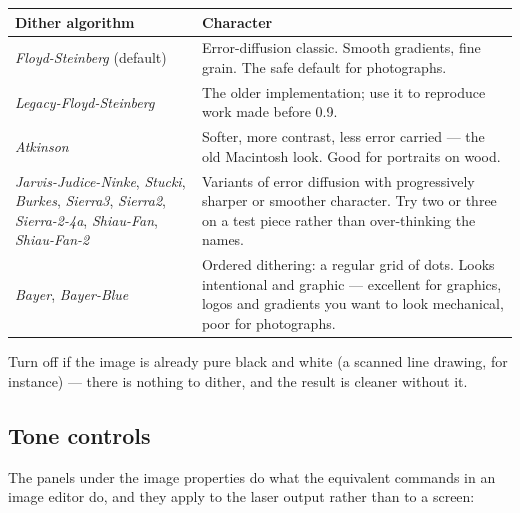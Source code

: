 \begin{center}\small
\begin{tabular}{@{}L{4.3cm}L{9.9cm}@{}}
\toprule
\textbf{Dither algorithm} & \textbf{Character} \\
\midrule
\emph{Floyd-Steinberg} (default) & Error-diffusion classic. Smooth gradients,
fine grain. The safe default for photographs. \\
\emph{Legacy-Floyd-Steinberg} & The older implementation; use it to reproduce
work made before 0.9. \\
\emph{Atkinson} & Softer, more contrast, less error carried --- the old
Macintosh look. Good for portraits on wood. \\
\emph{Jarvis-Judice-Ninke}, \emph{Stucki}, \emph{Burkes}, \emph{Sierra3},
\emph{Sierra2}, \emph{Sierra-2-4a}, \emph{Shiau-Fan}, \emph{Shiau-Fan-2} &
Variants of error diffusion with progressively sharper or smoother character.
Try two or three on a test piece rather than over-thinking the names. \\
\emph{Bayer}, \emph{Bayer-Blue} & Ordered dithering: a regular grid of dots.
Looks intentional and graphic --- excellent for graphics, logos and gradients you
want to look mechanical, poor for photographs. \\
\bottomrule
\end{tabular}
\end{center}

\noindent Turn  off if the image is already pure black and white (a
scanned line drawing, for instance) --- there is nothing to dither, and the result
is cleaner without it.

\subsection*{Tone controls}

The panels under the image properties do what the equivalent commands in an image
editor do, and they apply to the laser output rather than to a screen:

